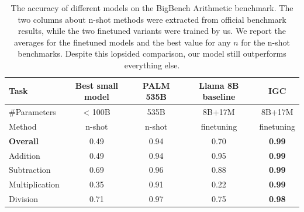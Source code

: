 \documentclass[11pt]{article}
\begin{document}
\begin{table}
    \centering
    \begin{tabular}{|l|c|c|c|c|}
        \hline
        Task & Best small model & PALM 535B & Llama 8B baseline & IGC \\
        \hline
        \#Parameters & < 100B & 535B & 8B+17M & 8B+17M \\
        \hline
        Method & n-shot & n-shot & finetuning & finetuning \\
        \hline
        \hline
        \textbf{Overall} & 0.49 & 0.94 & 0.70 & \textbf{0.99} \\
        \hline
        Addition & 0.49 & 0.94 & 0.95 & \textbf{0.99} \\
        Subtraction & 0.69 & 0.96 & 0.88 & \textbf{0.99} \\
        Multiplication & 0.35 & 0.91 & 0.22 & \textbf{0.99} \\
        Division & 0.71 & 0.97 & 0.75 & \textbf{0.98} \\
        \hline
    \end{tabular}
    \caption{
    The accuracy of different models on the BigBench Arithmetic benchmark. The two columns about n-shot methods were extracted from official benchmark results, %
    while the two finetuned variants were trained by us. We report the averages for the finetuned models and the best value for any $n$ for the n-shot benchmarks. Despite this lopsided comparison, our model still outperforms everything else.
    }
    \label{tab:performance_comparison}
\end{table}
\end{document}
